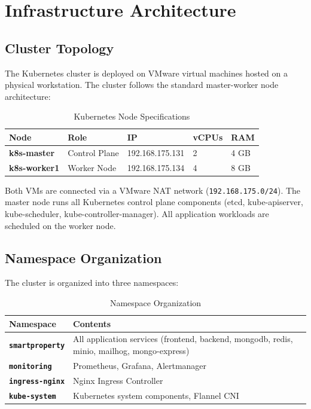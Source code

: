 \documentclass[12pt,a4paper]{report}
\begin{document}
\chapter{Infrastructure Architecture}

\section{Cluster Topology}

The Kubernetes cluster is deployed on VMware virtual machines hosted on a physical workstation. The cluster follows the standard master-worker node architecture:

\begin{table}[H]
  \centering
  \begin{tabular}{>{\bfseries}p{3cm} p{3cm} p{2.5cm} p{2.5cm} p{3cm}}
    \toprule
    \textbf{Node} & \textbf{Role} & \textbf{IP} & \textbf{vCPUs} & \textbf{RAM} \\
    \midrule
    k8s-master & Control Plane & 192.168.175.131 & 2 & 4 GB \\
    k8s-worker1 & Worker Node & 192.168.175.134 & 4 & 8 GB \\
    \bottomrule
  \end{tabular}
  \caption{Kubernetes Node Specifications}
\end{table}

\begin{infobox}
Both VMs are connected via a VMware NAT network (\texttt{192.168.175.0/24}). The master node runs all Kubernetes control plane components (etcd, kube-apiserver, kube-scheduler, kube-controller-manager). All application workloads are scheduled on the worker node.
\end{infobox}

\section{Namespace Organization}

The cluster is organized into three namespaces:

\begin{table}[H]
  \centering
  \begin{tabular}{>{\bfseries}p{4cm} p{9cm}}
    \toprule
    \textbf{Namespace} & \textbf{Contents} \\
    \midrule
    \texttt{smartproperty} & All application services (frontend, backend, mongodb, redis, minio, mailhog, mongo-express) \\
    \texttt{monitoring} & Prometheus, Grafana, Alertmanager \\
    \texttt{ingress-nginx} & Nginx Ingress Controller \\
    \texttt{kube-system} & Kubernetes system components, Flannel CNI \\
    \bottomrule
  \end{tabular}
  \caption{Namespace Organization}
\end{table}
\end{document}
